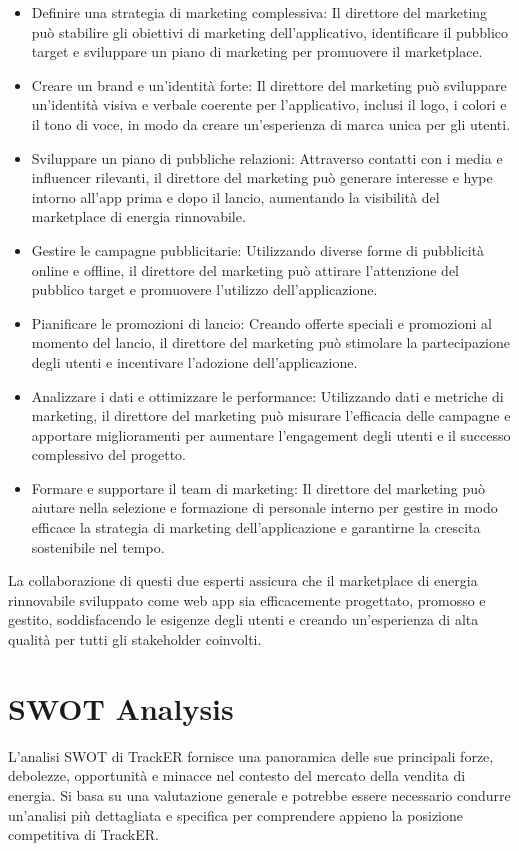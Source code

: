 \documentclass[oneside]{book}
\begin{document}
\begin{itemize}
    \item Definire una strategia di marketing complessiva: Il direttore del marketing può stabilire gli obiettivi di marketing dell'applicativo, identificare il pubblico target e sviluppare un piano di marketing per promuovere il marketplace.
    \item Creare un brand e un'identità forte: Il direttore del marketing può sviluppare un'identità visiva e verbale coerente per l'applicativo, inclusi il logo, i colori e il tono di voce, in modo da creare un'esperienza di marca unica per gli utenti.
    \item Sviluppare un piano di pubbliche relazioni: Attraverso contatti con i media e influencer rilevanti, il direttore del marketing può generare interesse e hype intorno all'app prima e dopo il lancio, aumentando la visibilità del marketplace di energia rinnovabile.
    \item Gestire le campagne pubblicitarie: Utilizzando diverse forme di pubblicità online e offline, il direttore del marketing può attirare l'attenzione del pubblico target e promuovere l'utilizzo dell'applicazione.
    \item Pianificare le promozioni di lancio: Creando offerte speciali e promozioni al momento del lancio, il direttore del marketing può stimolare la partecipazione degli utenti e incentivare l'adozione dell'applicazione.
    \item Analizzare i dati e ottimizzare le performance: Utilizzando dati e metriche di marketing, il direttore del marketing può misurare l'efficacia delle campagne e apportare miglioramenti per aumentare l'engagement degli utenti e il successo complessivo del progetto.
    \item Formare e supportare il team di marketing: Il direttore del marketing può aiutare nella selezione e formazione di personale interno per gestire in modo efficace la strategia di marketing dell'applicazione e garantirne la crescita sostenibile nel tempo.
\end{itemize}

La collaborazione di questi due esperti assicura che il marketplace di energia rinnovabile sviluppato come web app sia efficacemente progettato, promosso e gestito, soddisfacendo le esigenze degli utenti e creando un'esperienza di alta qualità per tutti gli stakeholder coinvolti.

\section{SWOT Analysis}
L'analisi SWOT di TrackER fornisce una panoramica delle sue principali forze, debolezze, opportunità e minacce nel contesto del mercato della vendita di energia. Si basa su una valutazione generale e potrebbe essere necessario condurre un'analisi più dettagliata e specifica per comprendere appieno la posizione competitiva di TrackER.
\end{document}
